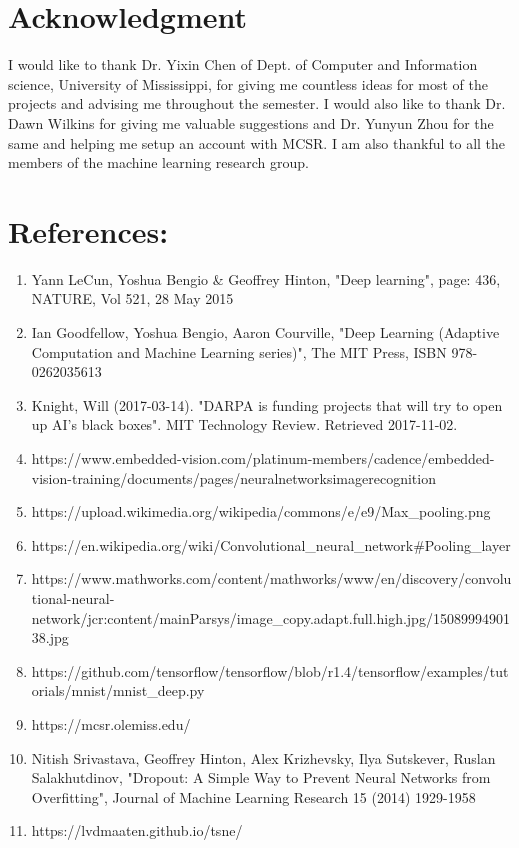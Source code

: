 \documentclass{article}
\begin{document}
\section*{Acknowledgment}
I would like to thank Dr. Yixin Chen of Dept. of Computer and Information science, University of Mississippi, for giving me countless ideas for most of the projects and advising me throughout the semester. I would also like to thank Dr. Dawn Wilkins for giving me valuable suggestions and Dr. Yunyun Zhou for the same and helping me setup an account with MCSR. I am also thankful to all the members of the machine learning research group.

\section*{References:}
\begin{enumerate}
\item Yann LeCun, Yoshua Bengio \& Geoffrey Hinton, "Deep learning", page: 436, NATURE, Vol 521, 28 May 2015
\item Ian Goodfellow,‎ Yoshua Bengio,‎ Aaron Courville, "Deep Learning (Adaptive Computation and Machine Learning series)", The MIT Press, ISBN 978-0262035613
\item Knight, Will (2017-03-14). "DARPA is funding projects that will try to open up AI's black boxes". MIT Technology Review. Retrieved 2017-11-02.
\item https://www.embedded-vision.com/platinum-members/cadence/embedded-vision-training/documents/pages/neuralnetworksimagerecognition
\item https://upload.wikimedia.org/wikipedia/commons/e/e9/Max\_pooling.png
\item https://en.wikipedia.org/wiki/Convolutional\_neural\_network\#Pooling\_layer
\item https://www.mathworks.com/content/mathworks/www/en/discovery/convolutional-neural-network/jcr:content/mainParsys/image\_copy.adapt.full.high.jpg/1508999490138.jpg
\item https://github.com/tensorflow/tensorflow/blob/r1.4/tensorflow/examples/tutorials/mnist/mnist\_deep.py
\item https://mcsr.olemiss.edu/
\item Nitish Srivastava, Geoffrey Hinton, Alex Krizhevsky, Ilya Sutskever, Ruslan Salakhutdinov, "Dropout: A Simple Way to Prevent Neural Networks from Overfitting", Journal of Machine Learning Research 15 (2014) 1929-1958
\item https://lvdmaaten.github.io/tsne/
\end{enumerate}
\end{document}
